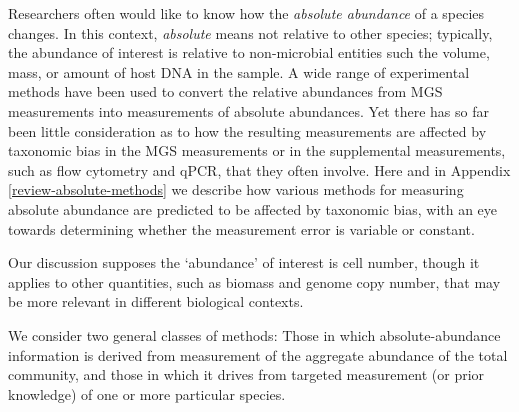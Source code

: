 \documentclass[
]{article}
\begin{document}
Researchers often would like to know how the \emph{absolute abundance} of a species changes.
In this context, \emph{absolute} means not relative to other species; typically, the abundance of interest is relative to non-microbial entities such the volume, mass, or amount of host DNA in the sample.
A wide range of experimental methods have been used to convert the relative abundances from MGS measurements into measurements of absolute abundances.
Yet there has so far been little consideration as to how the resulting measurements are affected by taxonomic bias in the MGS measurements or in the supplemental measurements, such as flow cytometry and qPCR, that they often involve.
Here and in Appendix \ref{review-absolute-methods} we describe how various methods for measuring absolute abundance are predicted to be affected by taxonomic bias, with an eye towards determining whether the measurement error is variable or constant.

Our discussion supposes the `abundance' of interest is cell number, though it applies to other quantities, such as biomass and genome copy number, that may be more relevant in different biological contexts.

We consider two general classes of methods: Those in which absolute-abundance information is derived from measurement of the aggregate abundance of the total community, and those in which it drives from targeted measurement (or prior knowledge) of one or more particular species.
\end{document}
